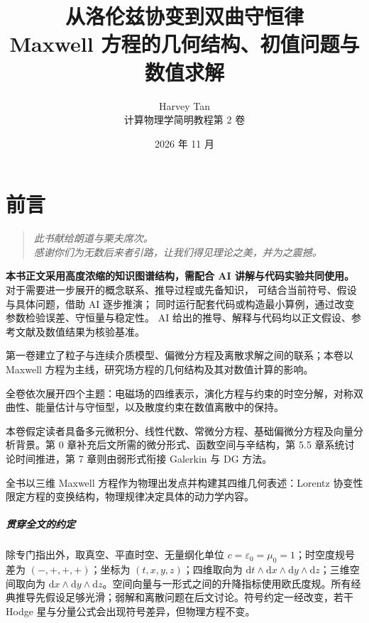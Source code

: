 \documentclass[UTF8,11pt,openany]{ctexbook}
\title{从洛伦兹协变到双曲守恒律\\[0.6em]\large Maxwell 方程的几何结构、初值问题与数值求解}
\author{Harvey Tan\\[0.6em]\large 计算物理学简明教程\quad 第 2 卷}
\date{2026 年 11 月}
\numberwithin{equation}{chapter}
\theoremstyle{definition}
\theoremstyle{remark}
\newcommand{\dd}{\mathrm d}
\begin{document}
\frontmatter
\maketitle
\chapter*{前言}
\begin{quote}
\itshape
此书献给朗道与栗夫席次。\\
感谢你们为无数后来者引路，让我们得见理论之美，并为之震撼。
\end{quote}
\begin{tcolorbox}[colback=red!3,colframe=red!65!black,title={使用说明：AI 讲解与代码实验},fonttitle=\bfseries,boxrule=0.8pt,arc=1mm,breakable]
\textbf{本书正文采用高度浓缩的知识图谱结构，需配合 AI 讲解与代码实验共同使用。}
对于需要进一步展开的概念联系、推导过程或先备知识，
可结合当前符号、假设与具体问题，借助 AI 逐步推演；
同时运行配套代码或构造最小算例，通过改变参数检验误差、守恒量与稳定性。
AI 给出的推导、解释与代码均以正文假设、参考文献及数值结果为核验基准。
\end{tcolorbox}
\noindent 第一卷建立了粒子与连续介质模型、偏微分方程及离散求解之间的联系；本卷以 Maxwell 方程为主线，研究场方程的几何结构及其对数值计算的影响。

全卷依次展开四个主题：电磁场的四维表示，演化方程与约束的时空分解，对称双曲性、能量估计与守恒型，以及散度约束在数值离散中的保持。

本卷假定读者具备多元微积分、线性代数、常微分方程、基础偏微分方程及向量分析背景。第 0 章补充后文所需的微分形式、函数空间与辛结构，第 5.5 章系统讨论时间推进，第 7 章则由弱形式衔接 Galerkin 与 DG 方法。

全书以三维 Maxwell 方程作为物理出发点并构建其四维几何表述：Lorentz 协变性限定方程的变换结构，物理规律决定具体的动力学内容。

\paragraph{贯穿全文的约定} 除专门指出外，取真空、平直时空、无量纲化单位 $c=\varepsilon_0=\mu_0=1$；时空度规号差为 $(-,+,+,+)$；坐标为 $(t,x,y,z)$；四维取向为 $\dd t\wedge\dd x\wedge\dd y\wedge\dd z$；三维空间取向为 $\dd x\wedge\dd y\wedge\dd z$。空间向量与一形式之间的升降指标使用欧氏度规。所有经典推导先假设足够光滑；弱解和离散问题在后文讨论。符号约定一经改变，若干 Hodge 星与分量公式会出现符号差异，但物理方程不变。

\tableofcontents
\end{document}
